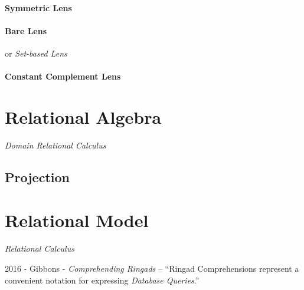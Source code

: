 \paragraph{Symmetric Lens}\label{sec:symmetric_lens}\hfill

\paragraph{Bare Lens}\label{sec:bare_lens}\hfill

or \emph{Set-based Lens}



\paragraph{Constant Complement Lens}\label{sec:constant_complement_lens}\hfill



\section{Relational Algebra}\label{sec:relational_algebra}

\emph{Domain Relational Calculus}



\subsection{Projection}\label{sec:relational_projection}



\section{Relational Model}\label{sec:relational_model}

\emph{Relational Calculus}


2016 - Gibbons - \emph{Comprehending Ringads} -- ``Ringad Comprehensions
represent a convenient notation for expressing \emph{Database Queries}.''




